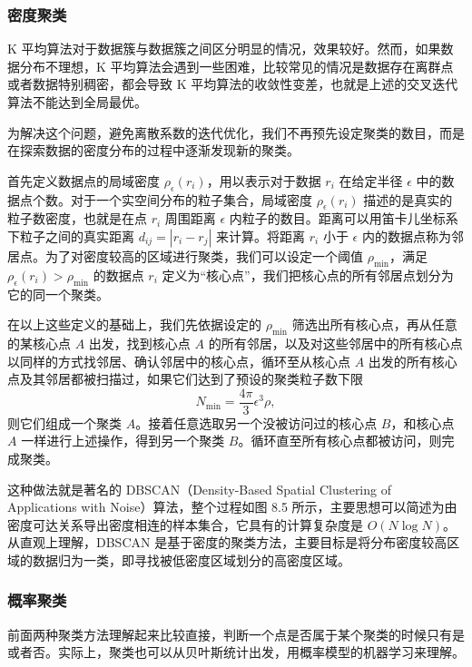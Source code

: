 
\subsubsection{密度聚类}
K 平均算法对于数据簇与数据簇之间区分明显的情况，效果较好。然而，如果数据分布不理想，K 平均算法会遇到一些困难，比较常见的情况是数据存在离群点或者数据特别稠密，都会导致 K 平均算法的收敛性变差，也就是上述的交叉迭代算法不能达到全局最优。

为解决这个问题，避免离散系数的迭代优化，我们不再预先设定聚类的数目，而是在探索数据的密度分布的过程中逐渐发现新的聚类。

首先定义数据点的局域密度 $\rho_\epsilon(r_i)$，用以表示对于数据 $r_i$ 在给定半径 $\epsilon$ 中的数据点个数。对于一个实空间分布的粒子集合，局域密度 $\rho_\epsilon(r_i)$ 描述的是真实的粒子数密度，也就是在点 $r_i$ 周围距离 $\epsilon$ 内粒子的数目。距离可以用笛卡儿坐标系下粒子之间的真实距离 $d_{ij}=|r_i-r_j|$ 来计算。将距离 $r_i$ 小于 $\epsilon$ 内的数据点称为邻居点。为了对密度较高的区域进行聚类，我们可以设定一个阈值 $\rho_{\min}$，满足 $\rho_\epsilon(r_i)>\rho_{\min}$ 的数据点 $r_i$ 定义为“核心点”，我们把核心点的所有邻居点划分为它的同一个聚类。

在以上这些定义的基础上，我们先依据设定的 $\rho_{\min}$ 筛选出所有核心点，再从任意的某核心点 $A$ 出发，找到核心点 $A$ 的所有邻居，以及对这些邻居中的所有核心点以同样的方式找邻居、确认邻居中的核心点，循环至从核心点 $A$ 出发的所有核心点及其邻居都被扫描过，如果它们达到了预设的聚类粒子数下限
\[
N_{\min}=\frac{4\pi}{3}\epsilon^3\rho,
\]
则它们组成一个聚类 $A$。接着任意选取另一个没被访问过的核心点 $B$，和核心点 $A$ 一样进行上述操作，得到另一个聚类 $B$。循环直至所有核心点都被访问，则完成聚类。

这种做法就是著名的 DBSCAN（Density-Based Spatial Clustering of Applications with Noise）算法，整个过程如图 8.5 所示，主要思想可以简述为由密度可达关系导出密度相连的样本集合，它具有的计算复杂度是 $O(N\log N)$。从直观上理解，DBSCAN 是基于密度的聚类方法，主要目标是将分布密度较高区域的数据归为一类，即寻找被低密度区域划分的高密度区域。

\subsubsection{概率聚类}
前面两种聚类方法理解起来比较直接，判断一个点是否属于某个聚类的时候只有是或者否。实际上，聚类也可以从贝叶斯统计出发，用概率模型的机器学习来理解。

